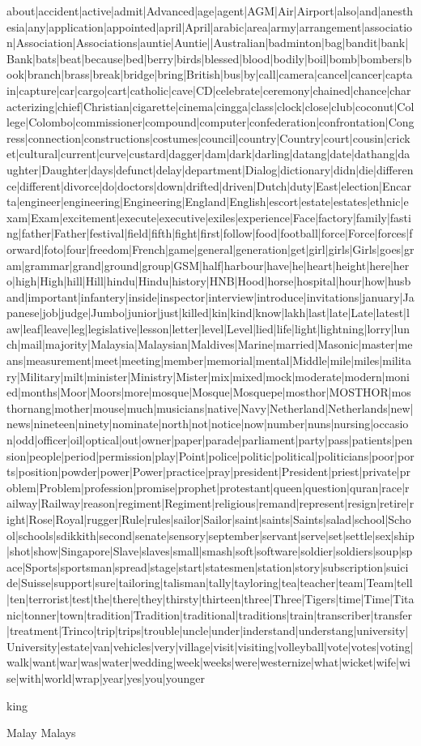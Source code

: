 about|accident|active|admit|Advanced|age|agent|AGM|Air|Airport|also|and|anesthesia|any|application|appointed|april|April|arabic|area|army|arrangement|association|Association|Associations|auntie|Auntie||Australian|badminton|bag|bandit|bank|Bank|bats|beat|because|bed|berry|birds|blessed|blood|bodily|boil|bomb|bombers|book|branch|brass|break|bridge|bring|British|bus|by|call|camera|cancel|cancer|captain|capture|car|cargo|cart|catholic|cave|CD|celebrate|ceremony|chained|chance|characterizing|chief|Christian|cigarette|cinema|cingga|class|clock|close|club|coconut|College|Colombo|commissioner|compound|computer|confederation|confrontation|Congress|connection|constructions|costumes|council|country|Country|court|cousin|cricket|cultural|current|curve|custard|dagger|dam|dark|darling|datang|date|dathang|daughter|Daughter|days|defunct|delay|department|Dialog|dictionary|didn|die|difference|different|divorce|do|doctors|down|drifted|driven|Dutch|duty|East|election|Encarta|engineer|engineering|Engineering|England|English|escort|estate|estates|ethnic|exam|Exam|excitement|execute|executive|exiles|experience|Face|factory|family|fasting|father|Father|festival|field|fifth|fight|first|follow|food|football|force|Force|forces|forward|foto|four|freedom|French|game|general|generation|get|girl|girls|Girls|goes|gram|grammar|grand|ground|group|GSM|half|harbour|have|he|heart|height|here|hero|high|High|hill|Hill|hindu|Hindu|history|HNB|Hood|horse|hospital|hour|how|husband|important|infantery|inside|inspector|interview|introduce|invitations|january|Japanese|job|judge|Jumbo|junior|just|killed|kin|kind|know|lakh|last|late|Late|latest|law|leaf|leave|leg|legislative|lesson|letter|level|Level|lied|life|light|lightning|lorry|lunch|mail|majority|Malaysia|Malaysian|Maldives|Marine|married|Masonic|master|means|measurement|meet|meeting|member|memorial|mental|Middle|mile|miles|military|Military|milt|minister|Ministry|Mister|mix|mixed|mock|moderate|modern|monied|months|Moor|Moors|more|mosque|Mosque|Mosquepe|mosthor|MOSTHOR|mosthornang|mother|mouse|much|musicians|native|Navy|Netherland|Netherlands|new|news|nineteen|ninety|nominate|north|not|notice|now|number|nuns|nursing|occasion|odd|officer|oil|optical|out|owner|paper|parade|parliament|party|pass|patients|pension|people|period|permission|play|Point|police|politic|political|politicians|poor|ports|position|powder|power|Power|practice|pray|president|President|priest|private|problem|Problem|profession|promise|prophet|protestant|queen|question|quran|race|railway|Railway|reason|regiment|Regiment|religious|remand|represent|resign|retire|right|Rose|Royal|rugger|Rule|rules|sailor|Sailor|saint|saints|Saints|salad|school|School|schools|sdikkith|second|senate|sensory|september|servant|serve|set|settle|sex|ship|shot|show|Singapore|Slave|slaves|small|smash|soft|software|soldier|soldiers|soup|space|Sports|sportsman|spread|stage|start|statesmen|station|story|subscription|suicide|Suisse|support|sure|tailoring|talisman|tally|tayloring|tea|teacher|team|Team|tell|ten|terrorist|test|the|there|they|thirsty|thirteen|three|Three|Tigers|time|Time|Titanic|tonner|town|tradition|Tradition|traditional|traditions|train|transcriber|transfer|treatment|Trinco|trip|trips|trouble|uncle|under|inderstand|understang|university|University|estate|van|vehicles|very|village|visit|visiting|volleyball|vote|votes|voting|walk|want|war|was|water|wedding|week|weeks|were|westernize|what|wicket|wife|wise|with|world|wrap|year|yes|you|younger

king


Malay
Malays 

